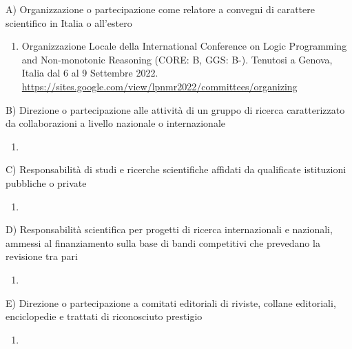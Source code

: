 \documentclass{resume} %
\begin{document}

\begin{rSectionLower}{A) Organizzazione o partecipazione come relatore a convegni di carattere scientifico in Italia o all'estero}
	\begin{enumerate}
		\item Organizzazione Locale della International Conference on Logic Programming and Non-monotonic Reasoning (CORE: B, GGS: B-). Tenutosi a Genova, Italia dal 6 al 9 Settembre 2022. \url{https://sites.google.com/view/lpnmr2022/committees/organizing}
	\end{enumerate}
\end{rSectionLower}

\begin{rSectionLower}{B) Direzione o partecipazione alle attività di un gruppo di ricerca caratterizzato da collaborazioni a livello nazionale o internazionale}
	\begin{enumerate}
		\item 
	\end{enumerate}
\end{rSectionLower}

\begin{rSectionLower}{C) Responsabilità di studi e ricerche scientifiche affidati da qualificate istituzioni pubbliche o private}
	\begin{enumerate}
		\item 
	\end{enumerate}
\end{rSectionLower}

\begin{rSectionLower}{D) Responsabilità scientifica per progetti di ricerca internazionali e nazionali, ammessi al finanziamento sulla base di bandi competitivi che prevedano la revisione tra pari}
	\begin{enumerate}
		\item 
	\end{enumerate}
\end{rSectionLower}

\begin{rSectionLower}{E) Direzione o partecipazione a comitati editoriali di riviste, collane editoriali, enciclopedie e trattati di riconosciuto prestigio}
	\begin{enumerate}
		\item 
	\end{enumerate}
\end{rSectionLower}
\end{document}
